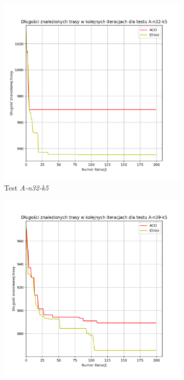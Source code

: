 \documentclass[10pt]{article}
\begin{document}
\begin{figure}[H]
     \centering
     \begin{subfigure}[b]{0.4\textwidth}
         \centering
         \includegraphics[width=\textwidth]{iterations_elitist_1.png}
         \caption{Test \textit{A-n32-k5}}
     \end{subfigure}
     \hfill
     \begin{subfigure}[b]{0.4\textwidth}
         \centering
         \includegraphics[width=\textwidth]{iterations_elitist_2.png}

\end{subfigure}
\end{figure}
\end{document}
